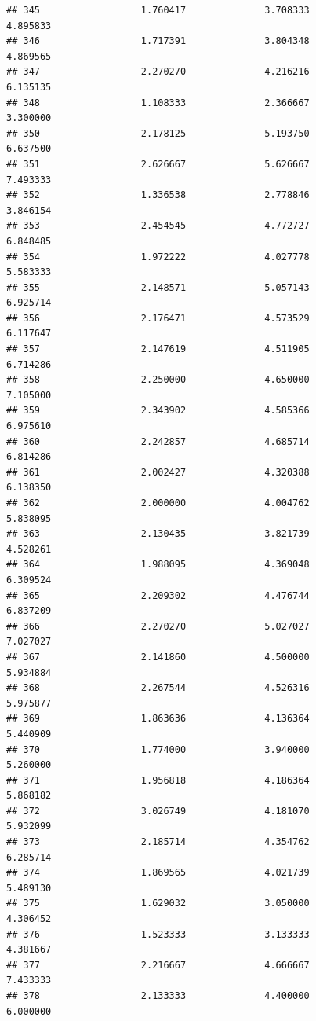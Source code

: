 \documentclass[]{article}
\begin{document}
\begin{verbatim}
## 345                  1.760417              3.708333                 4.895833
## 346                  1.717391              3.804348                 4.869565
## 347                  2.270270              4.216216                 6.135135
## 348                  1.108333              2.366667                 3.300000
## 350                  2.178125              5.193750                 6.637500
## 351                  2.626667              5.626667                 7.493333
## 352                  1.336538              2.778846                 3.846154
## 353                  2.454545              4.772727                 6.848485
## 354                  1.972222              4.027778                 5.583333
## 355                  2.148571              5.057143                 6.925714
## 356                  2.176471              4.573529                 6.117647
## 357                  2.147619              4.511905                 6.714286
## 358                  2.250000              4.650000                 7.105000
## 359                  2.343902              4.585366                 6.975610
## 360                  2.242857              4.685714                 6.814286
## 361                  2.002427              4.320388                 6.138350
## 362                  2.000000              4.004762                 5.838095
## 363                  2.130435              3.821739                 4.528261
## 364                  1.988095              4.369048                 6.309524
## 365                  2.209302              4.476744                 6.837209
## 366                  2.270270              5.027027                 7.027027
## 367                  2.141860              4.500000                 5.934884
## 368                  2.267544              4.526316                 5.975877
## 369                  1.863636              4.136364                 5.440909
## 370                  1.774000              3.940000                 5.260000
## 371                  1.956818              4.186364                 5.868182
## 372                  3.026749              4.181070                 5.932099
## 373                  2.185714              4.354762                 6.285714
## 374                  1.869565              4.021739                 5.489130
## 375                  1.629032              3.050000                 4.306452
## 376                  1.523333              3.133333                 4.381667
## 377                  2.216667              4.666667                 7.433333
## 378                  2.133333              4.400000                 6.000000

\end{verbatim}
\end{document}
